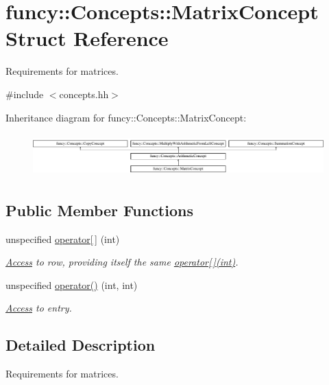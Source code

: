 \hypertarget{structfuncy_1_1Concepts_1_1MatrixConcept}{\section{funcy\-:\-:Concepts\-:\-:Matrix\-Concept Struct Reference}
\label{structfuncy_1_1Concepts_1_1MatrixConcept}
}


Requirements for matrices.  




{\ttfamily \#include $<$concepts.\-hh$>$}

Inheritance diagram for funcy\-:\-:Concepts\-:\-:Matrix\-Concept\-:\begin{figure}[H]
\begin{center}
\leavevmode
\includegraphics[height=1.656805cm]{structfuncy_1_1Concepts_1_1MatrixConcept}
\end{center}
\end{figure}
\subsection*{Public Member Functions}
\begin{DoxyCompactItemize}
\item 
unspecified \hyperlink{structfuncy_1_1Concepts_1_1MatrixConcept_aa6a15a7712bb85033a623557aed41141}{operator\mbox{[}$\,$\mbox{]}} (int)
\begin{DoxyCompactList}\small\item\em \hyperlink{namespacefuncy_1_1Access}{Access} to row, providing itself the same \hyperlink{structfuncy_1_1Concepts_1_1MatrixConcept_aa6a15a7712bb85033a623557aed41141}{operator\mbox{[}$\,$\mbox{]}(int)}. \end{DoxyCompactList}\item 
unspecified \hyperlink{structfuncy_1_1Concepts_1_1MatrixConcept_a3615e1855eca246b5ebe5b914bc3641d}{operator()} (int, int)
\begin{DoxyCompactList}\small\item\em \hyperlink{namespacefuncy_1_1Access}{Access} to entry. \end{DoxyCompactList}\end{DoxyCompactItemize}


\subsection{Detailed Description}
Requirements for matrices. 

